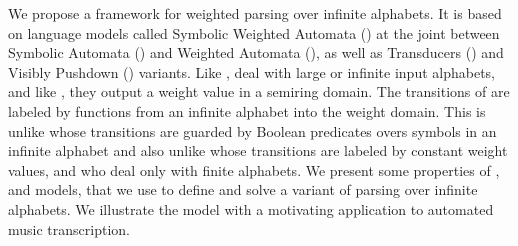 %
%
We propose a framework for weighted parsing over infinite alphabets.
%
It is based on language models called Symbolic Weighted Automata (\SWA)
at the joint %
between Symbolic Automata (\SA) and Weighted Automata (\WA),
as well as Transducers (\SWT) and Visibly Pushdown (\SWVPA) variants.
%
Like \SA, \SWA deal with large or infinite input alphabets,
and like \WA, they output a weight value in a semiring domain.
The transitions of \SWA are labeled by functions from an infinite alphabet into the weight domain.
This is unlike \SA whose transitions are guarded by Boolean predicates
overs symbols in an infinite alphabet
and also unlike \WA whose transitions are labeled by constant weight values,
and who deal only with finite alphabets.
%
We present some properties of \SWA, \SWT and \SWVPA models,
that we use to define and solve a variant of parsing
over infinite alphabets.
%
We illustrate the model with a motivating application to
automated music transcription.
